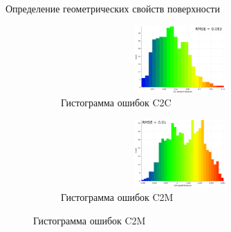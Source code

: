 \documentclass[aspectratio=169,xcolor=table,10pt]{beamer}
\begin{document}
\begin{frame}[t]{Определение геометрических свойств поверхности}
\begin{figure}[H]
        \begin{subfigure}[t]{0.49\textwidth}
            \centering\includegraphics[height=2.6cm,width=1\textwidth,keepaspectratio]{pcd_hist.png}
            \caption*{Гистограмма ошибок C2C}
        \end{subfigure}
        \begin{subfigure}[t]{0.49\textwidth}
            \centering\includegraphics[height=2.6cm,width=1\textwidth,keepaspectratio]{mesh_hist.png}
            \caption*{Гистограмма ошибок C2M}
        \end{subfigure}
    \end{figure}
\end{frame}
\end{document}
